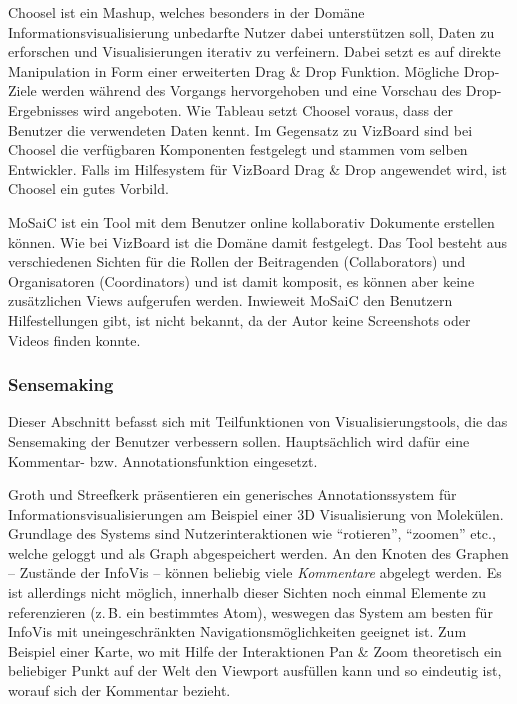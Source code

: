 \documentclass[
	headsepline,
	footsepline,
	fontsize=12pt,
	bibliography=totoc
]{scrbook}
\begin{document}

Choosel \cite{Grammel2010} ist ein Mashup, welches besonders in der Domäne Informationsvisualisierung unbedarfte Nutzer dabei unterstützen soll, Daten zu erforschen und Visualisierungen iterativ zu verfeinern. Dabei setzt es auf direkte Manipulation in Form einer erweiterten Drag \& Drop Funktion. Mögliche Drop-Ziele werden während des Vorgangs hervorgehoben und eine Vorschau des Drop-Ergebnisses wird  angeboten. Wie Tableau setzt Choosel voraus, dass der Benutzer die verwendeten Daten kennt. Im Gegensatz zu VizBoard sind bei Choosel die verfügbaren Komponenten festgelegt und stammen vom selben Entwickler. Falls im Hilfesystem für VizBoard Drag \& Drop angewendet wird, ist Choosel ein gutes Vorbild.


MoSaiC \cite{Schuster2011} ist ein Tool mit dem Benutzer online kollaborativ Dokumente erstellen können. Wie bei VizBoard ist die Domäne damit festgelegt. Das Tool besteht aus verschiedenen Sichten für die Rollen der Beitragenden (Collaborators) und Organisatoren (Coordinators) und ist damit komposit, es können aber keine zusätzlichen Views aufgerufen werden. Inwieweit MoSaiC den Benutzern Hilfestellungen gibt, ist nicht bekannt, da der Autor keine Screenshots oder Videos finden konnte.

\subsubsection{Sensemaking}
\label{section:standderforschung:verwandte_arbeiten:sensemaking}

Dieser Abschnitt befasst sich mit Teilfunktionen von Visualisierungstools, die das Sensemaking der Benutzer verbessern sollen. Hauptsächlich wird dafür eine Kommentar- bzw. Annotationsfunktion eingesetzt.


Groth und Streefkerk \cite{Groth2006} präsentieren ein generisches Annotationssystem für Informationsvisualisierungen am Beispiel einer 3D Visualisierung von Molekülen. Grundlage des Systems sind Nutzerinteraktionen wie \enquote{rotieren}, \enquote{zoomen} etc., welche geloggt und als Graph abgespeichert werden. An den Knoten des Graphen -- Zustände der InfoVis -- können beliebig viele \emph{Kommentare} abgelegt werden. Es ist allerdings nicht möglich, innerhalb dieser Sichten noch einmal Elemente zu referenzieren (z.\,B. ein bestimmtes Atom), weswegen das System am besten für InfoVis mit uneingeschränkten Navigationsmöglichkeiten geeignet ist. Zum Beispiel einer Karte, wo mit Hilfe der Interaktionen Pan \& Zoom theoretisch ein beliebiger Punkt auf der Welt den Viewport ausfüllen kann und so eindeutig ist, worauf sich der Kommentar bezieht.
\end{document}
